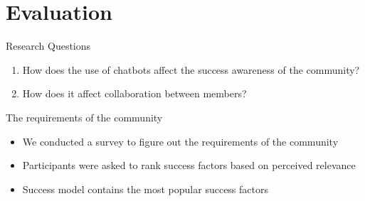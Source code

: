 \section{Evaluation}
\begin{frame}{Research Questions}
  \begin{enumerate}
    \item How does the use of chatbots affect the success awareness of the community?
    \item How does it affect collaboration between members?
  \end{enumerate}
\end{frame}


\begin{frame}{The requirements of the community}
  \begin{itemize}
    \item We conducted a survey to figure out the requirements of the community
    \item Participants were asked to rank success factors based on perceived relevance
    \item Success model contains the most popular success factors
  \end{itemize}
\end{frame}

